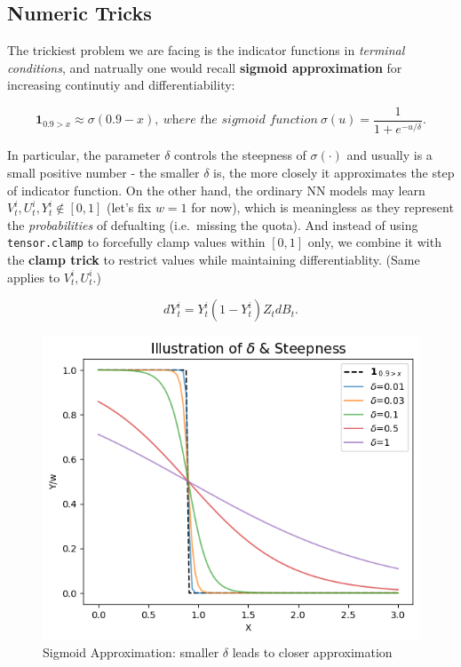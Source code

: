 \documentclass{article}
\begin{document}
\hypertarget{numeric-tricks}{%
\subsection{Numeric Tricks}\label{numeric-tricks}}

The trickiest problem we are facing is the indicator functions in
\emph{terminal conditions}, and natrually one would recall
\textbf{sigmoid approximation} for increasing continutiy and
differentiability:

\begin{equation}
    \mathbf{1}_{0.9>x} \approx \sigma(0.9-x), ~\textit{where the sigmoid function}~\sigma(u)=\frac{1}{1+e^{-u/\delta}}.
\end{equation}


In particular, the parameter \(\delta\) controls the steepness of
\(\sigma(\cdot)\) and usually is a small positive number - the smaller
\(\delta\) is, the more closely it approximates the step of indicator
function. On the other hand, the ordinary NN models may learn
\(V_t^i,U_t^i,Y_t^i \notin [0,1]\) (let's fix \(w=1\) for now), which is
meaningless as they represent the \emph{probabilities} of defualting
(i.e.~missing the quota). And instead of using \texttt{tensor.clamp} to
forcefully clamp values within \([0,1]\) only, we combine it with the
\textbf{clamp trick} to restrict values while maintaining
differentiablity. (Same applies to \(V_t^i, U_t^i\).)

\begin{equation}
    dY_t^i=Y_t^i(1-Y_t^i)Z_tdB_t.
\end{equation}

\begin{figure}[ht]
    \centering
    \includegraphics[width=0.5\linewidth]{FinalReports/Illustration_Diagrams/SigmoidApprox.png}
    \caption{Sigmoid Approximation: smaller $\delta$ leads to closer approximation}
    \label{fig:enter-label}
\end{figure}
\end{document}
